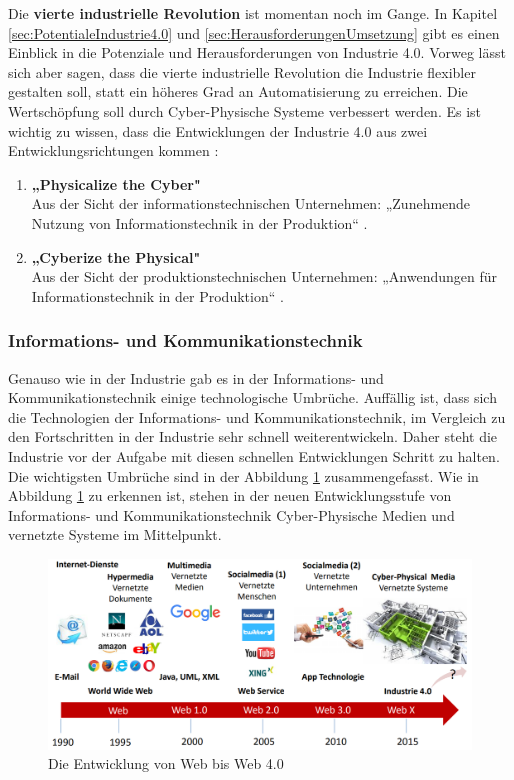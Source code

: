 \newline\newline
Die \textbf{vierte industrielle Revolution} ist momentan noch im Gange. In Kapitel \ref{sec:PotentialeIndustrie4.0} und \ref{sec:HerausforderungenUmsetzung} gibt es einen Einblick in die Potenziale und Herausforderungen von Industrie 4.0. Vorweg lässt sich aber sagen, dass die vierte industrielle Revolution die Industrie flexibler gestalten soll, statt ein höheres Grad an Automatisierung zu erreichen. Die Wertschöpfung soll durch Cyber-Physische Systeme verbessert werden. Es ist wichtig zu wissen, dass die Entwicklungen der Industrie 4.0 aus zwei Entwicklungsrichtungen kommen \cite{1}:
\begin{enumerate}
	\item \textbf{„Physicalize the Cyber"} \cite{1} \\ Aus der Sicht der informationstechnischen Unternehmen: „Zunehmende Nutzung von Informationstechnik in der Produktion“ \cite{1}.
	\item \textbf{„Cyberize the Physical"} \cite{1} \\ Aus der Sicht der produktionstechnischen Unternehmen: „Anwendungen für Informationstechnik in der Produktion“ \cite{1}.
\end{enumerate}

\subsubsection{Informations- und Kommunikationstechnik}\label{sec:WebRevolution}
Genauso wie in der Industrie gab es in der Informations- und Kommunikationstechnik einige technologische Umbrüche. Auffällig ist, dass sich die Technologien der Informations- und Kommunikationstechnik, im Vergleich zu den Fortschritten in der Industrie sehr schnell weiterentwickeln. Daher steht die Industrie vor der Aufgabe mit diesen schnellen Entwicklungen Schritt zu halten. Die wichtigsten Umbrüche sind in der Abbildung \ref{fig:WebRevolutionBild} zusammengefasst. Wie in Abbildung \ref{fig:WebRevolutionBild} zu erkennen ist, stehen in der neuen Entwicklungsstufe von Informations- und Kommunikationstechnik Cyber-Physische Medien und vernetzte Systeme im Mittelpunkt.
\begin{figure}[h]
	\centering
	\includegraphics[width=1\linewidth]{Bilder/A2_EntwicklungWeb0-4}
	\caption{Die Entwicklung von Web bis Web 4.0 \cite{A2}}
	\label{fig:WebRevolutionBild}
\end{figure}

